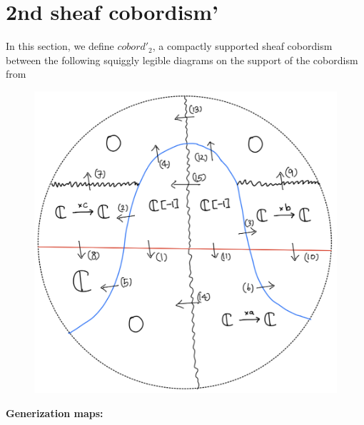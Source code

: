 \section{2nd sheaf cobordism'}
In this section, we define $cobord'_2$, a compactly supported sheaf cobordism between the following squiggly legible diagrams on the support of the cobordism from
\begin{figure}[H]
    \centering
    \includegraphics[scale = 0.45]{diagrams/cobord'2/29.png} 
    \caption{}
    \label{fig:your-label}
\end{figure}
\textbf{Generization maps:}

